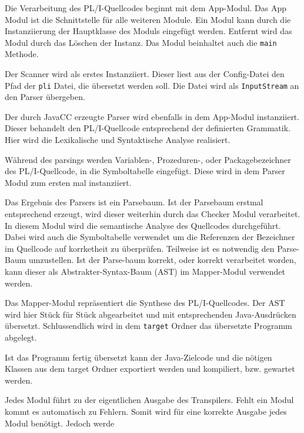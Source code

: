 Die Verarbeitung des PL/I-Quellcodes beginnt mit dem App-Modul. Das App Modul ist die Schnittstelle für alle weiteren Module. Ein Modul kann durch die Instanziierung der Hauptklasse des Moduls eingefügt werden. Entfernt wird das Modul durch das Löschen der Instanz. Das Modul beinhaltet auch die \verb+main+ Methode.

Der Scanner wird als erstes Instanziiert. Dieser liest aus der Config-Datei den Pfad der \verb+pli+ Datei, die übersetzt werden soll. Die Datei wird als \verb+InputStream+ an den Parser übergeben.

Der durch JavaCC erzeugte Parser wird ebenfalls in dem App-Modul instanziiert. Dieser behandelt den PL/I-Quellcode entsprechend der definierten Grammatik. Hier wird die Lexikalische und Syntaktische Analyse realisiert.

Während des parsings werden Variablen-, Prozeduren-, oder Packagebezeichner des PL/I-Quellcode, in die Symboltabelle eingefügt. Diese wird in dem Parser Modul zum ersten mal instanziiert. 

Das Ergebnis des Parsers ist ein Parsebaum.
Ist der Parsebaum erstmal entsprechend erzeugt, wird dieser weiterhin durch das Checker Modul verarbeitet. In diesem Modul wird die semantische Analyse des Quellcodes durchgeführt. Dabei wird auch die Symboltabelle verwendet um die Referenzen der Bezeichner im Quellcode auf korrketheit zu überprüfen. Teilweise ist es notwendig den Parse-Baum umzustellen. Ist der Parse-baum korrekt, oder korrekt verarbeitet worden, kann dieser als Abstrakter-Syntax-Baum (AST) im Mapper-Modul verwendet werden.

Das Mapper-Modul repräsentiert die Synthese des PL/I-Quellcodes. Der AST wird hier Stück für Stück abgearbeitet und mit entsprechenden Java-Ausdrücken übersetzt. Schlussendlich wird in dem \verb+target+ Ordner das übersetzte Programm abgelegt.
 
Ist das Programm fertig übersetzt kann der Java-Zielcode und die nötigen Klassen aus dem target Ordner exportiert werden und kompiliert, bzw. gewartet werden.

Jedes Modul führt zu der eigentlichen Ausgabe des Transpilers. Fehlt ein Modul kommt es automatisch zu Fehlern. 
Somit wird für eine korrekte Ausgabe jedes Modul benötigt.
Jedoch werde



